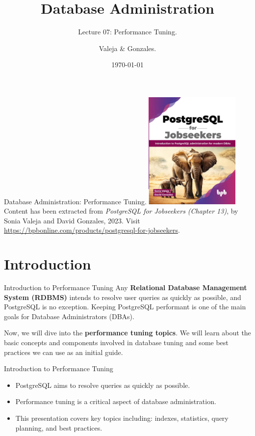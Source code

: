 \documentclass[aspectratio=169]{beamer}
\title[Performance]{Database Administration}
\subtitle{Lecture 07: Performance Tuning.}
\author{Valeja \& Gonzales.}
\date{\today}
\begin{document}
\frame{\titlepage}

\begin{frame}{Database Administration: Performance Tuning.}
    \centering
    \includegraphics[width=0.35\textwidth]{figures/book_cover}\\
    \vspace{2mm}
    {
        \scriptsize
        Content has been extracted from \textit{PostgreSQL for Jobseekers (Chapter 13)}, by Sonia Valeja and David Gonzales, 2023.  Visit \url{https://bpbonline.com/products/postgresql-for-jobseekers}.\\
    }
\end{frame}

\section{Introduction}

\begin{frame}{Introduction to Performance Tuning}
  \justifying
  Any \textbf{Relational Database Management System (RDBMS)} intends to resolve user queries as quickly as possible, and PostgreSQL is no exception.
  Keeping PostgreSQL performant is one of the main goals for Database Administrators (DBAs).

  \vspace{0.3cm}
  Now, we will dive into the \textbf{performance tuning topics}. We will learn about the basic concepts and components involved in database tuning and some best practices we can use as an initial guide.
\end{frame}

\begin{frame}{Introduction to Performance Tuning}
    \begin{itemize}
        \item PostgreSQL aims to resolve queries as quickly as possible.
        \item Performance tuning is a critical aspect of database administration.
        \item This presentation covers key topics including: indexes, statistics, query planning, and best practices.
    \end{itemize}
\end{frame}
\end{document}
